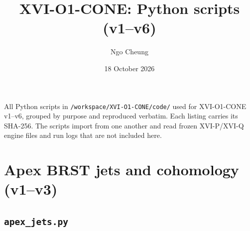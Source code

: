 \documentclass[10pt]{article}
\title{XVI-O1-CONE: Python scripts (v1--v6)}\author{Ngo Cheung}\date{18 October 2026}
\begin{document}
\maketitle
\noindent All Python scripts in \texttt{/workspace/XVI-O1-CONE/code/} used for XVI-O1-CONE v1--v6, grouped by purpose and reproduced verbatim. Each listing carries its SHA-256. The scripts import from one another and read frozen XVI-P/XVI-Q engine files and run logs that are not included here.
\tableofcontents
\section{Apex BRST jets and cohomology (v1--v3)}
\subsection{\texttt{apex\_jets.py}}
\end{document}
